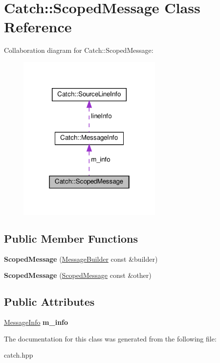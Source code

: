 \hypertarget{classCatch_1_1ScopedMessage}{}\section{Catch\+:\+:Scoped\+Message Class Reference}
\label{classCatch_1_1ScopedMessage}


Collaboration diagram for Catch\+:\+:Scoped\+Message\+:
\nopagebreak
\begin{figure}[H]
\begin{center}
\leavevmode
\includegraphics[width=202pt]{classCatch_1_1ScopedMessage__coll__graph}
\end{center}
\end{figure}
\subsection*{Public Member Functions}
\begin{DoxyCompactItemize}
\item 
\mbox{\label{classCatch_1_1ScopedMessage_a5cc59f0f2ebe840e6607f83004d49a17}} 
{\bfseries Scoped\+Message} (\hyperlink{structCatch_1_1MessageBuilder}{Message\+Builder} const \&builder)
\item 
\mbox{\label{classCatch_1_1ScopedMessage_ae03a17fd47220d563d4abc73e7518e29}} 
{\bfseries Scoped\+Message} (\hyperlink{classCatch_1_1ScopedMessage}{Scoped\+Message} const \&other)
\end{DoxyCompactItemize}
\subsection*{Public Attributes}
\begin{DoxyCompactItemize}
\item 
\mbox{\label{classCatch_1_1ScopedMessage_ae6e1476f389cc6e1586f033b3747b27b}} 
\hyperlink{structCatch_1_1MessageInfo}{Message\+Info} {\bfseries m\+\_\+info}
\end{DoxyCompactItemize}


The documentation for this class was generated from the following file\+:\begin{DoxyCompactItemize}
\item 
catch.\+hpp\end{DoxyCompactItemize}
